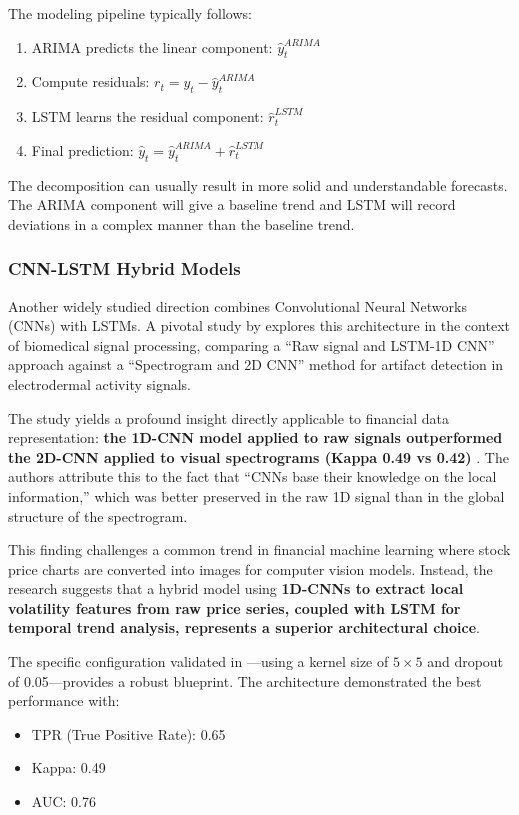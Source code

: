 The modeling pipeline typically follows:
\begin{enumerate}
    \item ARIMA predicts the linear component: $\hat{y}_t^{ARIMA}$
    \item Compute residuals: $r_t = y_t - \hat{y}_t^{ARIMA}$
    \item LSTM learns the residual component: $\hat{r}_t^{LSTM}$
    \item Final prediction: $\hat{y}_t = \hat{y}_t^{ARIMA} + \hat{r}_t^{LSTM}$
\end{enumerate}

The decomposition can usually result in more solid and understandable forecasts. The ARIMA component will give a baseline trend and LSTM will record deviations in a complex manner than the baseline trend.

\subsubsection{CNN-LSTM Hybrid Models}

Another widely studied direction combines Convolutional Neural Networks (CNNs) with LSTMs. A pivotal study by \cite{eda2023} explores this architecture in the context of biomedical signal processing, comparing a ``Raw signal and LSTM-1D CNN'' approach against a ``Spectrogram and 2D CNN'' method for artifact detection in electrodermal activity signals.

The study yields a profound insight directly applicable to financial data representation: \textbf{the 1D-CNN model applied to raw signals outperformed the 2D-CNN applied to visual spectrograms (Kappa 0.49 vs 0.42)} \cite{eda2023}. The authors attribute this to the fact that ``CNNs base their knowledge on the local information,'' which was better preserved in the raw 1D signal than in the global structure of the spectrogram.

This finding challenges a common trend in financial machine learning where stock price charts are converted into images for computer vision models. Instead, the research suggests that a hybrid model using \textbf{1D-CNNs to extract local volatility features from raw price series, coupled with LSTM for temporal trend analysis, represents a superior architectural choice}. 

The specific configuration validated in \cite{eda2023}---using a kernel size of $5 \times 5$ and dropout of 0.05---provides a robust blueprint. The architecture demonstrated the best performance with:
\begin{itemize}
    \item TPR (True Positive Rate): 0.65
    \item Kappa: 0.49
    \item AUC: 0.76
\end{itemize}

